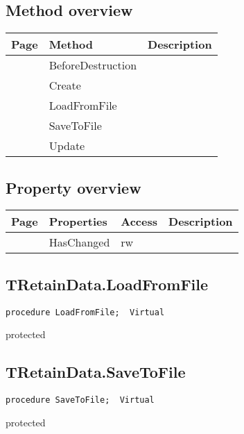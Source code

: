 \subsection{Method overview}
\label{computer:retain:tretaindata:methods}
\begin{tabularx}{\textwidth}{llX}
Page & Method & Description  \\ \hline
\pageref{computer:retain:tretaindata:beforedestruction} & BeforeDestruction  &  \\
\pageref{computer:retain:tretaindata:create} & Create  &  \\
\pageref{computer:retain:tretaindata:loadfromfile} & LoadFromFile  &  \\
\pageref{computer:retain:tretaindata:savetofile} & SaveToFile  &  \\
\pageref{computer:retain:tretaindata:update} & Update  &  \\
\hline
\end{tabularx}
\subsection{Property overview}
\label{computer:retain:tretaindata:properties}
\begin{tabularx}{\textwidth}{lllX}
Page & Properties & Access & Description \\ \hline
\pageref{computer:retain:tretaindata:haschanged} & HasChanged & rw &  \\
\hline
\end{tabularx}
\subsection{TRetainData.LoadFromFile}
\label{computer:retain:tretaindata:loadfromfile}
\begin{FPCList}
\Declaration 

\begin{verbatim}
procedure LoadFromFile;  Virtual
\end{verbatim}
\Visibility
protected
\end{FPCList}
\subsection{TRetainData.SaveToFile}
\label{computer:retain:tretaindata:savetofile}
\begin{FPCList}
\Declaration 

\begin{verbatim}
procedure SaveToFile;  Virtual
\end{verbatim}
\Visibility
protected
\end{FPCList}
